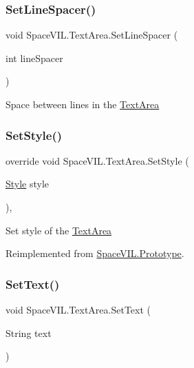 \subsubsection{\texorpdfstring{Set\+Line\+Spacer()}{SetLineSpacer()}}
{\footnotesize\ttfamily void Space\+V\+I\+L.\+Text\+Area.\+Set\+Line\+Spacer (\begin{DoxyParamCaption}\item[{int}]{line\+Spacer }\end{DoxyParamCaption})\hspace{0.3cm}{\ttfamily [inline]}}



Space between lines in the \mbox{\hyperlink{class_space_v_i_l_1_1_text_area}{Text\+Area}} 

\mbox{\label{class_space_v_i_l_1_1_text_area_a348d8c59439854876e894867fea7c7c1}} 
\subsubsection{\texorpdfstring{Set\+Style()}{SetStyle()}}
{\footnotesize\ttfamily override void Space\+V\+I\+L.\+Text\+Area.\+Set\+Style (\begin{DoxyParamCaption}\item[{\mbox{\hyperlink{class_space_v_i_l_1_1_decorations_1_1_style}{Style}}}]{style }\end{DoxyParamCaption})\hspace{0.3cm}{\ttfamily [inline]}, {\ttfamily [virtual]}}



Set style of the \mbox{\hyperlink{class_space_v_i_l_1_1_text_area}{Text\+Area}} 



Reimplemented from \mbox{\hyperlink{class_space_v_i_l_1_1_prototype_ae96644a6ace490afb376fb542161e541}{Space\+V\+I\+L.\+Prototype}}.

\mbox{\label{class_space_v_i_l_1_1_text_area_a5c1fcd7e4bcf6c9a508d997f59b27bcb}} 
\subsubsection{\texorpdfstring{Set\+Text()}{SetText()}}
{\footnotesize\ttfamily void Space\+V\+I\+L.\+Text\+Area.\+Set\+Text (\begin{DoxyParamCaption}\item[{String}]{text }\end{DoxyParamCaption})\hspace{0.3cm}{\ttfamily [inline]}}



